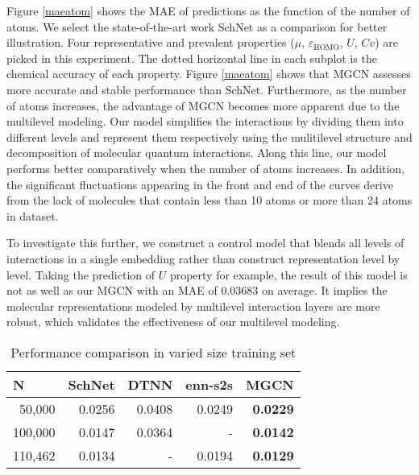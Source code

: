 \documentclass[letterpaper]{article} \usepackage{bm}
\begin{document}
 Figure \ref{maeatom} shows the MAE of predictions as the function of the number of atoms. We select the state-of-the-art work SchNet as a comparison for better illustration. Four representative and prevalent properties ($\mu$, $\varepsilon_{\text{HOMO}}$, $U$, $Cv$) are picked in this experiment. The dotted horizontal line in each subplot is the chemical accuracy of each property. Figure \ref{maeatom} shows that MGCN assesses more accurate and stable performance than SchNet. Furthermore, as the number of atoms increases, the advantage of MGCN becomes more apparent due to the multilevel modeling. Our model simplifies the interactions by dividing them into different levels and represent them respectively using the mulitilevel structure and decomposition of molecular quantum interactions. Along this line, our model performs better comparatively when the number of atoms increases. In addition, the significant fluctuations appearing in the front and end of the curves derive from the lack of molecules that contain less than 10 atoms or more than 24 atoms in dataset.  
 
 To investigate this further, we construct a control model that blends all levels of interactions in a single embedding rather than construct representation level by level. Taking the prediction of $U$ property for example, the result of this model is not as well as our MGCN with an MAE of 0.03683 on average. It implies the molecular representations modeled by multilevel interaction layers are more robust, which validates the effectiveness of our multilevel modeling.
 
 

\begin{table}[tbp]
\centering
\caption{Performance comparison in varied size training set}
\begin{tabular}{rrrrr}
    \toprule

    \multicolumn{1}{l}{N} & \multicolumn{1}{l}{SchNet} & \multicolumn{1}{l}{DTNN} & \multicolumn{1}{l}{enn-s2s} & \multicolumn{1}{l}{MGCN} \\
    \midrule
    \midrule
    50,000 & 0.0256 & 0.0408 &  0.0249& \textbf{0.0229} \\
    100,000 & 0.0147 & 0.0364 & - & \textbf{0.0142} \\
    110,462 & 0.0134 & -      & 0.0194 & \textbf{0.0129} \\
    \bottomrule

\end{tabular}

\label{size}\end{table}
\end{document}
